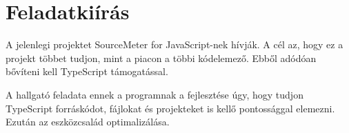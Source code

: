 \chapter*{Feladatkiírás}
A jelenlegi projektet SourceMeter for JavaScript-nek hívják.
A cél az, hogy ez a projekt többet tudjon, mint a piacon a többi kódelemező.
Ebből adódóan bővíteni kell TypeScript támogatással.


A hallgató feladata ennek a programnak a fejlesztése úgy, hogy tudjon TypeScript forráskódot, fájlokat és projekteket is kellő pontossággal elemezni.
Ezután az eszközcsalád optimalizálása.
